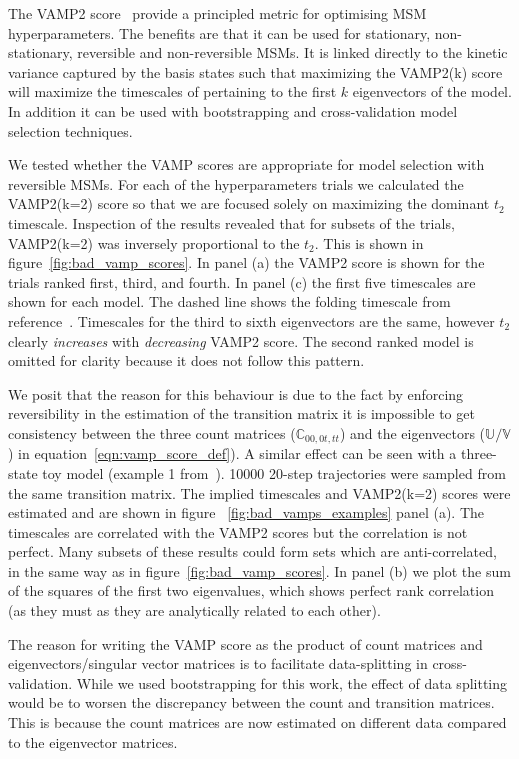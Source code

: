 \documentclass[journal=jacsat,manuscript=article]{achemso}
\begin{document}
The VAMP2 score~\cite{wuVariationalApproachLearning2020c} provide a principled metric for optimising MSM hyperparameters. The benefits are that it can be used for stationary, non-stationary, reversible and non-reversible MSMs. It is linked directly to the kinetic variance captured by the basis states such that maximizing the VAMP2(k) score will maximize the timescales of pertaining to the first $k$ eigenvectors of the model. In addition it can be used with bootstrapping and cross-validation model selection techniques. 

We tested whether the VAMP scores are appropriate for model selection with reversible MSMs. For each of the hyperparameters trials we calculated the VAMP2(k=2) score so that we are focused solely on maximizing the dominant $t_2$ timescale. Inspection of the results revealed that for subsets of the trials, VAMP2(k=2) was inversely proportional to the $t_2$. This is shown in figure~\ref{fig:bad_vamp_scores}. In panel (a) the VAMP2 score is shown for the trials ranked first, third, and fourth. In panel (c) the first five timescales are shown for each model.  The dashed line shows the folding timescale from reference~\cite{lindorff-larsen_how_2011}. Timescales for the third to sixth eigenvectors are the same, however $t_2$ clearly \emph{increases} with \emph{decreasing} VAMP2 score. The second ranked model is omitted for clarity because it does not follow this pattern. 

We posit that the reason for this behaviour is due to the fact by enforcing reversibility in the estimation of the transition matrix it is impossible to get consistency between the three count matrices ($\mathbb{C}_{00, 0t, tt}$) and the eigenvectors ($\mathbb{U}/\mathbb{V}$) in equation~\ref{eqn:vamp_score_def}).  A similar effect can be seen with a three-state toy model (example 1 from~\cite{trendelkamp-schroer_estimation_2015}). \num{10000} 20-step trajectories were sampled from the same transition matrix. The implied timescales and VAMP2(k=2) scores were estimated and are shown in figure ~\ref{fig:bad_vamps_examples} panel (a).  The timescales are correlated with the VAMP2 scores but the correlation is not perfect. Many subsets of these results could form sets which are anti-correlated, in the same way as in figure~\ref{fig:bad_vamp_scores}. In panel (b) we plot the sum of the squares of the first two eigenvalues, which shows perfect rank correlation (as they must as they are analytically related to each other). 

The reason for writing the VAMP score as the product of count matrices and eigenvectors/singular vector matrices is to facilitate data-splitting in cross-validation. While we used bootstrapping for this work, the effect of data splitting would be to worsen the discrepancy between the count and transition matrices. This is because the count matrices are now estimated on different data compared to the eigenvector matrices.  
\end{document}
